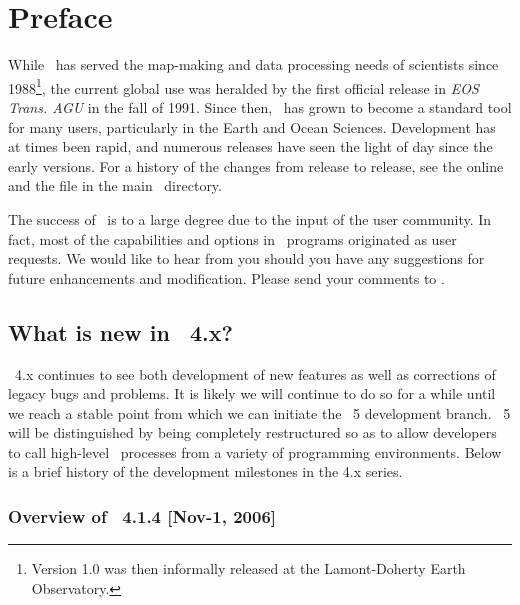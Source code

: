 %
%
\chapter{Preface} 
\label{ch:1}
\thispagestyle{headings}

While \GMT\ has served the map-making and data processing needs of scientists since 1988\footnote{Version
1.0 was then informally released at the Lamont-Doherty Earth Observatory.}, the current global use was
heralded by the first official release in {\it EOS Trans. AGU} in the fall of 1991.  Since then,
\GMT\ has grown to become a standard tool for many users, particularly in the Earth and Ocean Sciences.
Development has at times been rapid, and numerous releases have seen the light of day since the early
versions.  For a history of the changes from release to release, see the online
and the file  in the main \GMT\ directory.

The success of \GMT\ is to a large degree due to the input of the user community. In fact, most of the
capabilities and options in \GMT\ programs originated as user requests.
We would like to hear from you should you have any suggestions for future enhancements and modification.
Please send your comments to
.

\section{What is new in \gmt\ 4.x?}

\GMT\ 4.x continues to see both development of new features as well as corrections of
legacy bugs and problems.  It is likely we will continue to do so for a while until we
reach a stable point from which we can initiate the \GMT\ 5 development branch.  \GMT\ 5
will be distinguished by being completely restructured so as to allow developers to call
high-level \GMT\ processes from a variety of programming environments.  Below is a brief
history of the development milestones in the 4.x series.

\subsection{Overview of \gmt\ 4.1.4 [Nov-1, 2006]}

